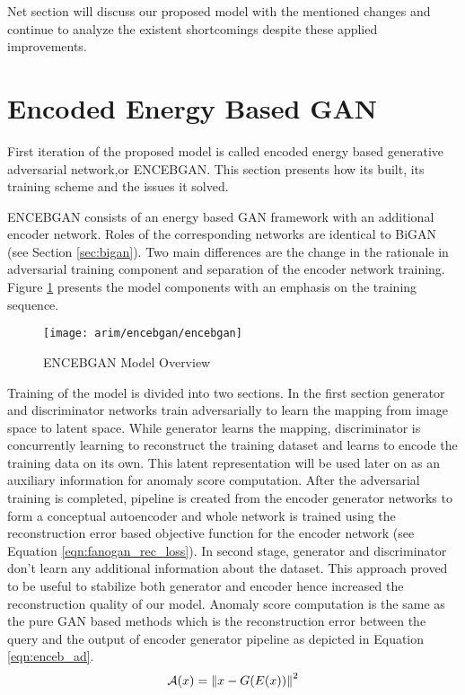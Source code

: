 Net section will discuss our proposed model with the mentioned changes and continue to analyze the
existent shortcomings despite these applied improvements.


\section{Encoded Energy Based GAN}
\label{sec:encebgan}

First iteration of the proposed model is called encoded energy based generative adversarial
network,or ENCEBGAN. This section presents how its built, its training scheme and the issues it
solved.

ENCEBGAN consists of an energy based GAN framework with an additional
encoder network. Roles of the corresponding networks are identical to BiGAN (see Section \ref{sec:bigan}). Two main
differences are the change in the rationale in adversarial training component and separation of the
encoder network training. Figure \ref{fig:encebgan_model} presents the model components with an
emphasis on the training sequence.
\begin{figure}[h!]
	\centering
	\texttt{[image: arim/encebgan/encebgan]}
	\caption{ENCEBGAN Model Overview }
	\label{fig:encebgan_model}
\end{figure}

Training of the model is divided into two sections. In the first section generator and discriminator networks
train adversarially to learn the mapping from image space to latent space. While generator learns
the mapping, discriminator is concurrently learning to reconstruct the training dataset and learns
to encode the training data on its own. This latent representation will be used later on as an
auxiliary information for anomaly score computation. After the adversarial training is completed,
pipeline is created from the encoder generator networks to form a conceptual autoencoder and whole
network is trained using the reconstruction error based objective function for the encoder network (see Equation \ref{eqn:fanogan_rec_loss}).
In second stage, generator and discriminator don't learn any additional information about the
dataset. This approach proved to be useful to stabilize both generator and encoder hence increased
the reconstruction quality of our model. Anomaly score computation is the same as the pure GAN based
methods which is the reconstruction error between the query and the output of encoder generator
pipeline as depicted in Equation \ref{eqn:enceb_ad}. 
\begin{equation}
	\label{eqn:enceb_ad}
	\mathcal{A}(x) = \left\lVert x - G(E(x))\right\rVert^2
\end{equation}

